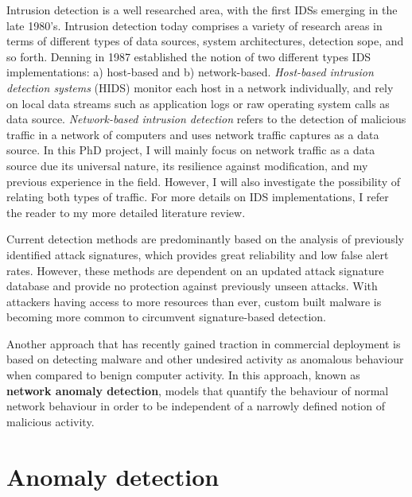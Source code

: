 \documentclass[a4paper,12pt,twoside]{report}
\begin{document}
Intrusion detection is a well researched area, with the first IDSs emerging in the late 1980's. Intrusion detection today comprises a variety of research areas in terms of different types of data sources, system architectures, detection sope, and so forth. Denning \cite{denning1987intrusion} in 1987 established the notion of two different types IDS implementations: a) host-based and b) network-based. 
\textit{Host-based intrusion detection systems} (HIDS) monitor each host in a network individually, and rely on local data streams such as application logs or raw operating system calls as  data source. \textit{Network-based intrusion detection} refers to the detection of malicious traffic in a network of computers and uses network traffic captures as a data source. In this PhD project, I will mainly focus on network traffic as a data source due its universal nature, its resilience against modification, and my previous experience in the field. However, I will also investigate the possibility of relating both types of traffic. For more details on IDS implementations, I refer the reader to my more detailed literature review. 


Current detection methods are predominantly based on the analysis of previously identified attack signatures, which provides great reliability and low false alert rates. However, these methods are dependent on an updated attack signature database and provide no protection against previously unseen attacks. With attackers having access to more resources than ever, custom built malware is becoming more common to circumvent signature-based detection. 

Another approach that has recently gained traction in commercial deployment is based on detecting malware and other undesired activity as anomalous behaviour when compared to benign computer activity. In this approach, known as \textbf{network anomaly detection}, models that quantify the behaviour of normal network behaviour in order to be independent of a narrowly defined notion of malicious activity.



\section{Anomaly detection}
\end{document}
